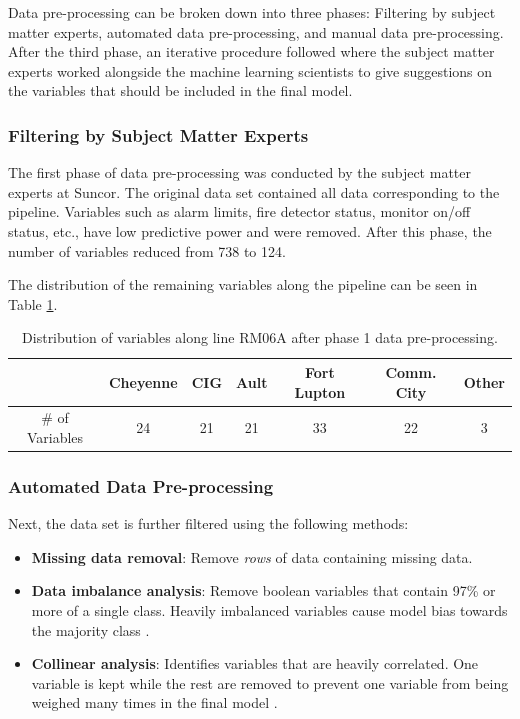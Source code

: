 Data pre-processing can be broken down into three phases: Filtering by subject matter experts, automated data pre-processing, and manual data pre-processing.  After the third phase, an iterative procedure followed where the subject matter experts worked alongside the machine learning scientists to give suggestions on the variables that should be included in the final model.

\subsubsection{Filtering by Subject Matter Experts}
The first phase of data pre-processing was conducted by the subject matter experts at Suncor.  The original data set contained all data corresponding to the pipeline.  Variables such as alarm limits, fire detector status, monitor on/off status, etc., have low predictive power and were removed.  After this phase, the number of variables reduced from 738 to 124.  

The distribution of the remaining variables along the pipeline can be seen in Table \ref{tab:08Ph1Data}.

\begin{table}[h]
    \centering
    {
    \begin{tabular}{ c | c | c | c | c | c | c}
             &  Cheyenne & CIG & Ault & Fort Lupton & Comm. City & Other      \\
        \hline
        \# of Variables  &  24  &  21  &  21  &  33  &  22  &  3  \\
    \end{tabular}}
    \caption{Distribution of variables along line RM06A after phase 1 data pre-processing.}
    \label{tab:08Ph1Data}
\end{table}

\subsubsection{Automated Data Pre-processing}
Next, the data set is further filtered using the following methods:

\begin{itemize}
    \item \textbf{Missing data removal}: Remove \textit{rows} of data containing missing data.
    \item \textbf{Data imbalance analysis}: Remove boolean variables that contain 97\% or more of a single class.  Heavily imbalanced variables cause model bias towards the majority class \cite{data_preprocessing}.
    \item \textbf{Collinear analysis}: Identifies variables that are heavily correlated.  One variable is kept while the rest are removed to prevent one variable from being weighed many times in the final model \cite{data_preprocessing}.
\end{itemize}

